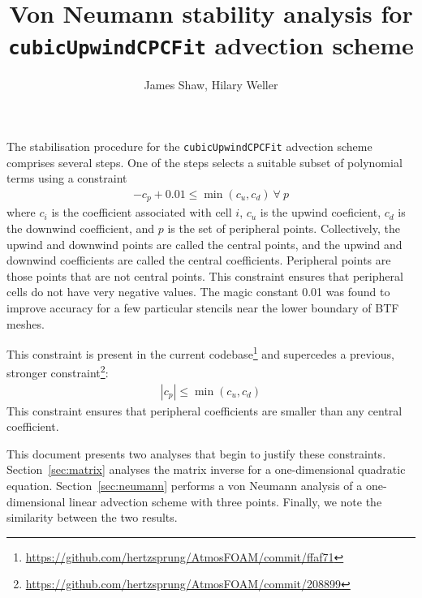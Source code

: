 \documentclass{article}
\title{Von Neumann stability analysis for \texttt{cubicUpwindCPCFit} advection scheme}
\author{James Shaw, Hilary Weller}
\begin{document}
\maketitle

The stabilisation procedure for the \texttt{cubicUpwindCPCFit} advection scheme comprises several steps.  One of the steps selects a suitable subset of polynomial terms using a constraint
\begin{align}
	-c_p + 0.01 \leq \min(c_u, c_d)\:\forall\:p
\end{align}
where $c_i$ is the coefficient associated with cell $i$, $c_u$ is the upwind coeficient, $c_d$ is the downwind coefficient, and $p$ is the set of peripheral points.  Collectively, the upwind and downwind points are called the central points, and the upwind and downwind coefficients are called the central coefficients.  Peripheral points are those points that are not central points.
This constraint ensures that peripheral cells do not have very negative values.  The magic constant \num{0.01} was found to improve accuracy for a few particular stencils near the lower boundary of BTF meshes.

This constraint is present in the current codebase\footnote{\url{https://github.com/hertzsprung/AtmosFOAM/commit/ffaf71}} and supercedes a previous, stronger constraint\footnote{\url{https://github.com/hertzsprung/AtmosFOAM/commit/208899}}:
\begin{align}
	|c_p| \leq \min(c_u, c_d)
\end{align}
This constraint ensures that peripheral coefficients are smaller than any central coefficient.

This document presents two analyses that begin to justify these constraints.  Section~\ref{sec:matrix} analyses the matrix inverse for a one-dimensional quadratic equation.  Section~\ref{sec:neumann} performs a von Neumann analysis of a one-dimensional linear advection scheme with three points.  Finally, we note the similarity between the two results.
\end{document}

